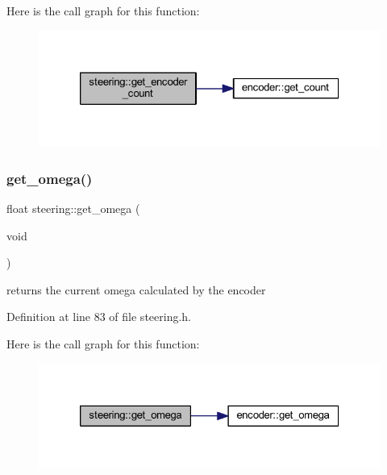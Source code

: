 Here is the call graph for this function\+:
\nopagebreak
\begin{figure}[H]
\begin{center}
\leavevmode
\includegraphics[width=326pt]{classsteering_ae32b701e46af6861f02b59aeb64beb0c_cgraph}
\end{center}
\end{figure}
\mbox{\label{classsteering_a925978d3d3c42042b56d52a2dc049371}} 
\subsubsection{\texorpdfstring{get\_omega()}{get\_omega()}}
{\footnotesize\ttfamily float steering\+::get\+\_\+omega (\begin{DoxyParamCaption}\item[{void}]{ }\end{DoxyParamCaption})\hspace{0.3cm}{\ttfamily [inline]}}



returns the current omega calculated by the encoder 



Definition at line 83 of file steering.\+h.

Here is the call graph for this function\+:
\nopagebreak
\begin{figure}[H]
\begin{center}
\leavevmode
\includegraphics[width=326pt]{classsteering_a925978d3d3c42042b56d52a2dc049371_cgraph}
\end{center}
\end{figure}
\mbox{\label{classsteering_aab3b80efec6ef14734213ec15c228543}} 
